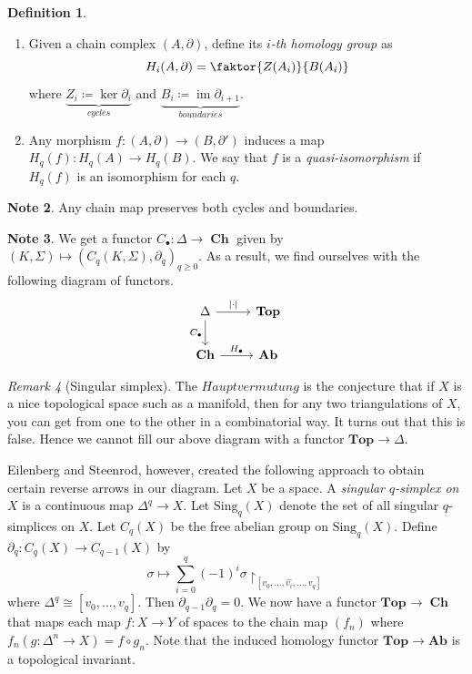 \documentclass[10pt,letterpaper,cm]{nupset}
\theoremstyle{definition}
\newtheorem{definition}{Definition}[subsection]
\newtheorem{note}[definition]{Note}
\theoremstyle{theorem}
\theoremstyle{remark}
\newtheorem{remark}[definition]{Remark}
\newcommand{\1}{\mathbb{1}}
\newcommand{\0}{\vec 0}
\DeclareMathOperator{\im}{im}
\DeclareMathOperator{\ch}{\mathbf{Ch}}
\begin{document}
\begin{definition} $ $
\begin{enumerate}
\item Given a chain complex $(A, \partial)$, define its \textit{$i$-th homology group} as $$ H_i(A, \partial) = \faktor{Z(A_i)}{B(A_i)} $$ where $\underbrace{Z_i \coloneqq  \ker{\partial_{i}}}_{\textit{cycles}}$ and $\underbrace{B_i \coloneqq  \im{\partial_{i+1}}}_{\textit{boundaries}}$. 
\item Any morphism $f: (A, \partial) \to (B, \partial ')$ induces a map $H_q(f) : H_q(A) \to H_q(B)$. We say that $f$ is a \textit{quasi-isomorphism} if $H_q(f)$ is an isomorphism for each $q$. 
\end{enumerate}
\end{definition}

\begin{note}
Any chain map preserves both cycles and boundaries.
\end{note}

\begin{note}
We get a functor $C_{\bullet}: \Delta \to \ch$ given by $(K, \Sigma) \mapsto (C_q(K, \Sigma), \partial_{q})_{q\geq 0}$. As a result, we find ourselves with the following diagram of functors.
\[
\begin{tikzcd}
\Delta \arrow[d, "C_{\bullet}"'] \arrow[r, "|\cdot|"] & \mathbf{Top} \\
\ch \arrow[r, "H_{\bullet}"] & \mathbf{Ab}
\end{tikzcd}
\]
\end{note}

\begin{remark}[Singular simplex]
The $\textit{Hauptvermutung}$ is the conjecture that if $X$ is a nice topological space such as a manifold, then for any two triangulations of $X$, you  can get from one to the other in a combinatorial way. It turns out that this is false. Hence we cannot fill our above diagram with a functor $\mathbf{Top} \to \Delta$.

Eilenberg and Steenrod, however, created the following approach to obtain certain reverse arrows in our diagram. Let $X$ be a space. A \textit{singular $q$-simplex on $X$}  is a continuous map $\Delta^q \to X$. Let $\text{Sing}_q(X)$ denote the set of all singular $q$-simplices on $X$. Let $C_q(X)$ be the free abelian group on $\text{Sing}_q(X)$. Define $\partial_{q} : C_q(X) \to C_{q-1}(X)$ by 
$$\sigma \mapsto \sum_{i=0}^q(-1)^i \sigma \restriction_{[v_0, \ldots, \widehat{v_i}, \ldots, v_q]}$$ 
where $\Delta^q \cong [v_0, \ldots, v_q]$. Then $\partial_{q-1}\partial_q =0$. We now have a functor $\mathbf{Top} \to \ch$ that maps each map $f: X \to Y$ of spaces to the chain map $(f_n)$ where $f_n(g: \Delta^n \to X) = f \circ g_n$. Note that the induced homology functor $\mathbf{Top} \to \mathbf{Ab}$ is a topological invariant. 
\end{remark}
\end{document}
